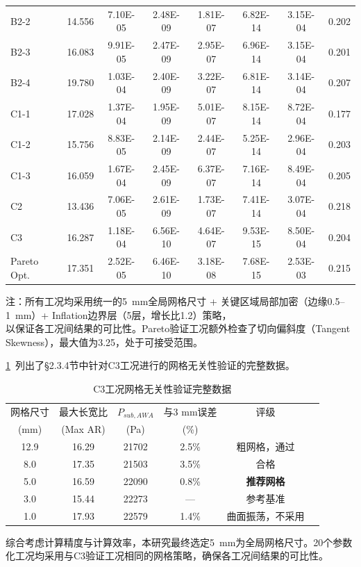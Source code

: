 \begin{table}[!htb]
\begin{tabular}{@{}lccccccc@{}}
    B2-2         & 14.556 & 7.10E-05 & 2.48E-09 & 1.81E-07 & 6.82E-14 & 3.15E-04 & 0.202 \\
    B2-3         & 16.083 & 9.91E-05 & 2.47E-09 & 2.95E-07 & 6.96E-14 & 3.15E-04 & 0.201 \\
    B2-4         & 19.780 & 1.03E-04 & 2.40E-09 & 3.22E-07 & 6.81E-14 & 3.14E-04 & 0.207 \\
    C1-1         & 17.028 & 1.37E-04 & 1.95E-09 & 5.01E-07 & 8.15E-14 & 8.72E-04 & 0.177 \\
    C1-2         & 15.756 & 8.83E-05 & 2.14E-09 & 2.44E-07 & 5.25E-14 & 2.96E-04 & 0.203 \\
    C1-3         & 16.059 & 1.67E-04 & 2.45E-09 & 6.37E-07 & 7.16E-14 & 8.49E-04 & 0.205 \\
    C2           & 13.436 & 7.06E-05 & 2.61E-09 & 1.73E-07 & 7.41E-14 & 3.07E-04 & 0.218 \\
    C3           & 16.287 & 1.18E-04 & 6.56E-10 & 4.64E-07 & 9.53E-15 & 8.50E-04 & 0.204 \\
    Pareto Opt.  & 17.351 & 2.52E-05 & 6.46E-10 & 3.18E-08 & 7.68E-15 & 2.53E-03 & 0.215 \\
    \bottomrule
  \end{tabular}

  \vspace{0.5em}
  \begin{flushleft}
  注：所有工况均采用统一的5~mm全局网格尺寸 + 关键区域局部加密（边缘0.5--1~mm）+ Inflation边界层（5层，增长比1.2）策略，\\
  以保证各工况间结果的可比性。Pareto验证工况额外检查了切向偏斜度（Tangent Skewness），最大值为3.25，处于可接受范围。
  \end{flushleft}
\end{table}



\cref{tab:appendix-mesh-independence}~列出了§2.3.4节中针对C3工况进行的网格无关性验证的完整数据。

\begin{table}[!htb]
  \caption{C3工况网格无关性验证完整数据}\label{tab:appendix-mesh-independence}
  \centering
  \begin{tabular}{@{}cccccl@{}}
    \toprule
    网格尺寸 & 最大长宽比 & $P_{sub,AWA}$ & 与3 mm误差 & 评级 \\
    (mm)    & (Max AR)  & (Pa)          & (\%)       &      \\
    \midrule
    12.9 & 16.29 & 21702 & 2.5\% & 粗网格，通过 \\
    8.0  & 17.35 & 21503 & 3.5\% & 合格 \\
    5.0  & 16.59 & 22090 & 0.8\% & \textbf{推荐网格} \\
    3.0  & 15.44 & 22273 & ---   & 参考基准 \\
    1.0  & 17.93 & 22579 & 1.4\% & 曲面振荡，不采用 \\
    \bottomrule
  \end{tabular}
\end{table}

综合考虑计算精度与计算效率，本研究最终选定5~mm为全局网格尺寸。20个参数化工况均采用与C3验证工况相同的网格策略，确保各工况间结果的可比性。

